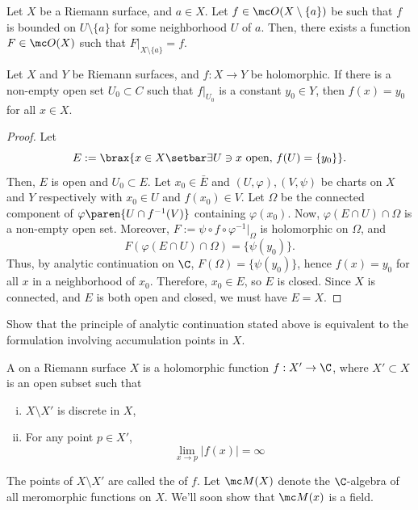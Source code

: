 \documentclass[11pt]{report}
\begin{document}
\begin{thm}
    Let $X$ be a Riemann surface, and $a \in X$. Let $f \in \mc O(X\setminus \{a\})$ be such that $f$ is bounded on $U \setminus \{a\}$ for some neighborhood $U$ of $a$. Then, there exists a function $F \in \mc O(X)$ such that $F|_{X\setminus\{a\}}=f$. 
\end{thm}

\begin{thm}
    Let $X$ and $Y$ be Riemann surfaces, and $f : X \to Y$ be holomorphic. If there is a non-empty open set $U_0 \subset C$ such that $f|_{U_0}$ is a constant $y_0 \in Y$, then $f(x) =y_0$ for all $x \in X$.
\end{thm}

\begin{proof}
    Let 
    $$E:= \brax{x \in X \setbar \exists U\ni x \text{ open, } f(U) =\{y_0\} }.$$
    Then, $E$ is open and $U_0 \subset E$. Let $x_0 \in \bar E$ and $(U,\varphi),(V,\psi)$ be charts on $X$ and $Y$ respectively with $x_0 \in U$ and $f(x_0) \in V$. Let $\Omega$ be the connected component of $\varphi\paren{U \cap f^{-1}(V)}$ containing $\varphi(x_0)$. Now, $\varphi(E \cap U) \cap \Omega$ is a non-empty open set. Moreover, $F:= \psi \circ f \circ \varphi^{-1}|_\Omega$ is holomorphic on $\Omega$, and 
    $$F(\varphi(E \cap U) \cap \Omega) = \{\psi(y_0)\}.$$
    Thus, by analytic continuation on $\C$, $F(\Omega) = \{\psi(y_0)\}$, hence $f(x)=y_0$ for all $x$ in a neighborhood of $x_0$. Therefore, $x_0 \in E$, so $E$ is closed. Since $X$ is connected, and $E$ is both open and closed, we must have $E=X$.
\end{proof}

\begin{exercise}
    Show that the principle of analytic continuation stated above is equivalent to the formulation involving accumulation points in $X$.
\end{exercise}

\begin{defn}
    A  on a Riemann surface $X$ is a holomorphic function $f:X'\to \C$, where $X'\subset X$ is an open subset such that
    \begin{enumerate}[(i)]
        \item $X \setminus X'$ is discrete in $X$,
        \item For any point $p \in X'$, 
        $$\lim_{x \to p}|f(x)| = \infty$$
    \end{enumerate}
    The points of $X\setminus X'$ are called the  of $f$. Let $\mc M(X)$ denote the $\C$-algebra of all meromorphic functions on $X$. We'll soon show that $\mc M(x)$ is a field.
\end{defn}
\end{document}
